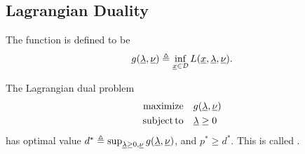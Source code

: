 \subsection{Lagrangian Duality}


\begin{definition}
The  function is defined to be
\[ g(\underline{\lambda},\underline{\nu}) \triangleq \inf_{\underline{x}\in \mathcal{D}} L(\underline{x},\underline{\lambda},\underline{\nu}). \]
\end{definition}


\begin{lemma}
The Lagrangian dual problem
\begin{align*}
\mathrm{maximize} \quad & g(\underline{\lambda},\underline{\nu}) \\
\mathrm{subject\,to} \quad & \underline{\lambda} \geq 0
\end{align*}
has optimal value $d^*\triangleq\sup_{\underline\lambda\ge0,\underline\nu}g(\underline\lambda,\underline\nu)$, and $p^*\geq d^*$.
This is called .
\end{lemma}

